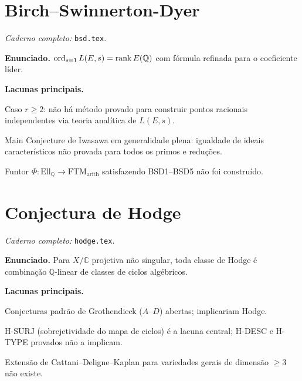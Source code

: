 \documentclass[11pt,a4paper]{article}
\begin{document}

\clearpage

\section{Birch–Swinnerton-Dyer}

\textit{Caderno completo:} \texttt{bsd.tex}.

\medskip
\noindent\textbf{Enunciado.}
$\operatorname{ord}_{s=1}L(E,s)=\operatorname{rank} E(\mathbb Q)$ com fórmula refinada
para o coeficiente líder.

\medskip
\noindent\textbf{Lacunas principais.}
\begin{gap}
  Caso $r\ge2$: não há método provado para construir pontos racionais
  independentes via teoria analítica de $L(E,s)$. \OPEN
\end{gap}
\begin{gap}
  Main Conjecture de Iwasawa em generalidade plena: igualdade de ideais
  característicos não provada para todos os primos e reduções. \OPEN
\end{gap}
\begin{gap}
  Funtor $\Phi:\mathrm{Ell}_{\mathbb Q}\to\mathrm{FTM}_{\mathrm{arith}}$
  satisfazendo BSD1–BSD5 não foi construído. \OPEN
\end{gap}


\clearpage

\section{Conjectura de Hodge}

\textit{Caderno completo:} \texttt{hodge.tex}.

\medskip
\noindent\textbf{Enunciado.}
Para $X/\mathbb C$ projetiva não singular, toda classe de Hodge é
combinação $\mathbb Q$-linear de classes de ciclos algébricos.

\medskip
\noindent\textbf{Lacunas principais.}
\begin{gap}
  Conjecturas padrão de Grothendieck ($A$–$D$) abertas; implicariam Hodge. \OPEN
\end{gap}
\begin{gap}
  H-SURJ (sobrejetividade do mapa de ciclos) é a lacuna central;
  H-DESC e H-TYPE provados não a implicam. \OPEN
\end{gap}
\begin{gap}
  Extensão de Cattani–Deligne–Kaplan para variedades gerais de dimensão $\ge3$
  não existe. \OPEN
\end{gap}
\end{document}
